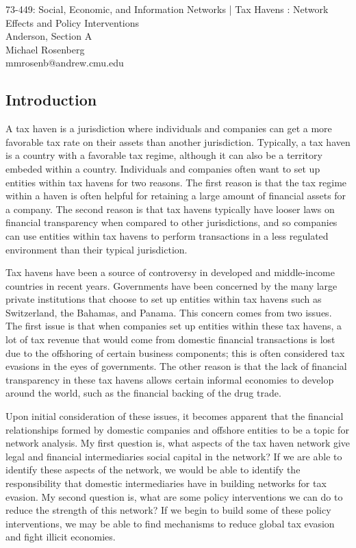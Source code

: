 \documentclass[11pt]{article}
\makeatletter
\newcommand{\myname}{Michael Rosenberg}
\newcommand{\myandrew}{mmrosenb@andrew.cmu.edu}
\newcommand{\mycourse}{73-449: Social, Economic, and Information Networks}
\newcommand{\myhwname}{| Tax Havens : Network Effects and Policy Interventions}
\newcommand{\myrecitation}{Anderson, Section A}
\newcommand{\myteammates}{}
\makeatother
\begin{document}
\begin{center}
    {\Large \mycourse} {\Large \myhwname} \\
    \myrecitation \\
    \myname \\
    \myandrew \\
\end{center}

\subsection{Introduction}

A tax haven is a jurisdiction where individuals and companies can get a
more favorable tax rate on their assets than another
jurisdiction. Typically, a tax haven is a country with a
favorable tax regime, although it can also be a territory embeded within a
country. Individuals and companies often want to set up entities within tax
havens for two reasons. The first reason is that the tax regime within
a haven is often helpful for retaining a large amount of financial assets
for a company. The second reason is that tax havens typically have looser
laws on financial transparency when compared to other jurisdictions, and so
companies can use entities within tax havens to perform
transactions in a less regulated environment than their typical jurisdiction.

Tax havens have been a source of controversy in developed and middle-income
countries in recent years. Governments have been concerned by the many large
private institutions that choose to set up entities within tax havens such as
Switzerland, the Bahamas, and Panama. This concern comes from two issues. The
first issue is that when companies set up entities within these tax havens, a
lot of tax revenue that would come from domestic financial transactions is lost
due to the offshoring of certain business components; this is often considered
tax evasions in the eyes of governments. The other reason is that the lack of
financial transparency in these tax havens allows certain informal economies to
develop around the world, such as the financial backing of the drug trade.

Upon initial consideration of these issues, it becomes apparent that
the financial relationships formed by
domestic companies and offshore entities to be a topic for network analysis. 
My first question is, what aspects of the tax haven
network give legal and financial intermediaries social capital in the network?
If we are able to identify these aspects of the network, we would be able to
identify the responsibility that domestic intermediaries have in building
networks for tax evasion. My second question is, what are some policy
interventions we can do to reduce the strength of this network? If we begin to
build some of these policy interventions, we may be able to find mechanisms to
reduce global tax evasion and fight illicit economies.
\end{document}
